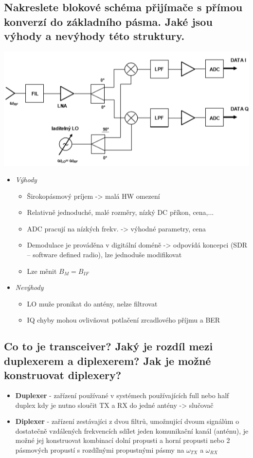 \documentclass[a4paper]{article}
\begin{document}
\subsection{\textbf{Nakreslete blokové schéma přijímače s přímou konverzí do základního pásma. Jaké jsou výhody a nevýhody této struktury.}}
\includegraphics{images/tx_priama_konv.png}
\begin{itemize}
	\item\textit{Výhody}
	\begin{itemize}
		\item Širokopásmový príjem -> malá HW omezení
		\item Relativně jednoduché, malé rozměry, nízký DC příkon, cena,...
		\item ADC pracují na nízkých frekv. -> výhodné parametry, cena
		\item Demodulace je prováděna v digitální doméně -> odpovídá koncepci (SDR – software defined radio), lze jednoduše modifikovat
		\item Lze měnit $B_M=B_{IF}$
	\end{itemize}
	\item\textit{Nevýhody}
	\begin{itemize}
		\item LO muže pronikat do antény, nelze filtrovat
		\item IQ chyby mohou ovlivňovat potlačení zrcadlového příjmu a BER
	\end{itemize}
\end{itemize}
\subsection{\textbf{Co to je transceiver? Jaký je rozdíl mezi duplexerem a diplexerem? Jak je možné konstruovat diplexery?}}
\begin{itemize}
	\item \textbf{Duplexer} - zařízení používané v systémech používajících full nebo half duplex kdy je nutno sloučit TX a RX do jedné antény -> slučovač
	\item \textbf{Diplexer} - zařízení zestávajíci z dvou filtrů, umožnující dvoum signálům o dostatečně vzdálených frekvencích sdílet jeden komunikační kanál (anténu), je možné jej konstruovat kombinací dolní propusti a horní propusti nebo 2 pásmových propustí s rozdílnými propustnými pásmy na $\omega_{TX}$ a $\omega_{RX}$
\end{itemize}
\end{document}

